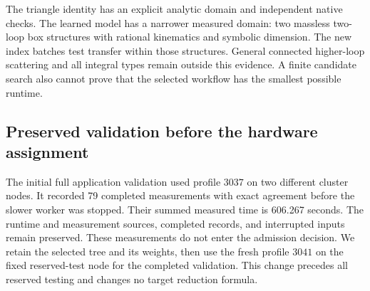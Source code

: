 The triangle identity has an explicit analytic domain and independent native checks. The learned model has a narrower measured domain: two massless two-loop box structures with rational kinematics and symbolic dimension. The new index batches test transfer within those structures. General connected higher-loop scattering and all integral types remain outside this evidence. A finite candidate search also cannot prove that the selected workflow has the smallest possible runtime.
\FloatBarrier
\subsection{Preserved validation before the hardware assignment}
The initial full application validation used profile $3037$ on two different cluster nodes. It recorded 79 completed measurements with exact agreement before the slower worker was stopped. Their summed measured time is 606.267 seconds. The runtime and measurement sources, completed records, and interrupted inputs remain preserved. These measurements do not enter the admission decision. We retain the selected tree and its weights, then use the fresh profile $3041$ on the fixed reserved-test node for the completed validation. This change precedes all reserved testing and changes no target reduction formula.
